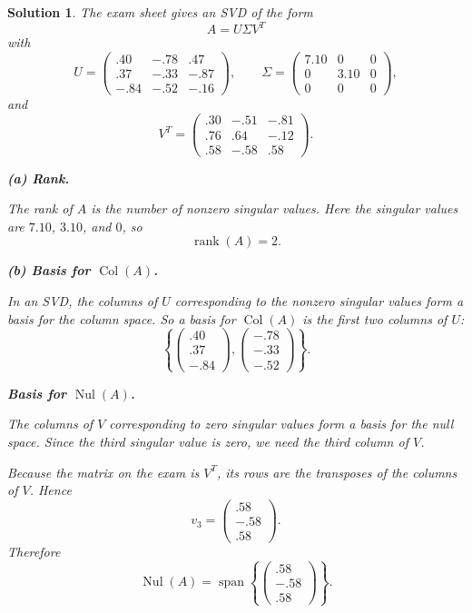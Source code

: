 \documentclass[11pt,a4paper]{article}
\theoremstyle{sol}
\newtheorem*{solution}{Solution}
\newcommand{\Span}{\operatorname{span}}
\newcommand{\Col}{\operatorname{Col}}
\newcommand{\Nul}{\operatorname{Nul}}
\newcommand{\Rank}{\operatorname{rank}}
\begin{document}
\begin{solution}
The exam sheet gives an SVD of the form
\[
A=U\Sigma V^T
\]
with
\[
U=
\begin{pmatrix}
.40&-.78&.47\\
.37&-.33&-.87\\
-.84&-.52&-.16
\end{pmatrix},
\qquad
\Sigma=
\begin{pmatrix}
7.10&0&0\\
0&3.10&0\\
0&0&0
\end{pmatrix},
\]
and
\[
V^T=
\begin{pmatrix}
.30&-.51&-.81\\
.76&.64&-.12\\
.58&-.58&.58
\end{pmatrix}.
\]

\textbf{(a) Rank.}

The rank of $A$ is the number of nonzero singular values. Here the singular values are $7.10$, $3.10$, and $0$, so
\[
\boxed{\Rank(A)=2.}
\]

\textbf{(b) Basis for $\Col(A)$.}

In an SVD, the columns of $U$ corresponding to the nonzero singular values form a basis for the column space. So a basis for $\Col(A)$ is the first two columns of $U$:
\[
\boxed{
\left\{
\begin{pmatrix}.40\\.37\\-.84\end{pmatrix},
\begin{pmatrix}-.78\\-.33\\-.52\end{pmatrix}
\right\}.
}
\]

\textbf{Basis for $\Nul(A)$.}

The columns of $V$ corresponding to zero singular values form a basis for the null space. Since the third singular value is zero, we need the third column of $V$.

Because the matrix on the exam is $V^T$, its rows are the transposes of the columns of $V$. Hence
\[
v_3=
\begin{pmatrix}
.58\\
-.58\\
.58
\end{pmatrix}.
\]
Therefore
\[
\boxed{
\Nul(A)=\Span\left\{
\begin{pmatrix}
.58\\
-.58\\
.58
\end{pmatrix}
\right\}.
}
\]
\end{solution}
\end{document}
